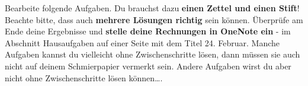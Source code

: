 \documentclass[
  ngerman,
]{book}
\begin{document}
Bearbeite folgende Aufgaben. Du brauchst dazu \textbf{einen Zettel und einen Stift}! Beachte bitte, dass auch \textbf{mehrere Lösungen richtig} sein können. Überprüfe am Ende deine Ergebnisse und \textbf{stelle deine Rechnungen in OneNote ein} - im Abschnitt Hausaufgaben auf einer Seite mit dem Titel 24. Februar. Manche Aufgaben kannst du vielleicht ohne Zwischenschritte lösen, dann müssen sie auch nicht auf deinem Schmierpapier vermerkt sein. Andere Aufgaben wirst du aber nicht ohne Zwischenschritte lösen können\ldots.

  
\end{document}
